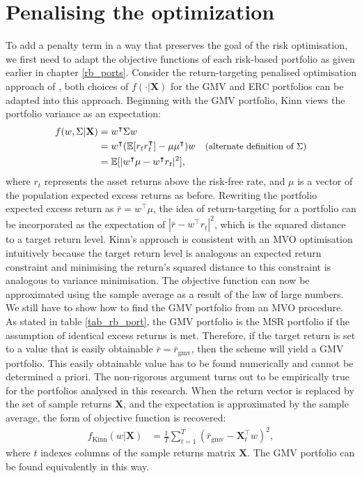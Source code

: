 \documentclass[a4paper,11pt,nocenter,bold,noupper,headcount]{mythesis}
\theoremstyle{plain}
\theoremstyle{definition}
\begin{document}
\section{Penalising the optimization}

To add a penalty term in a way that preserves the goal of the risk optimisation, we first need to adapt the objective functions of each risk-based portfolio as given earlier in chapter \ref{rb_ports}. Consider the return-targeting penalised optimisation approach of \cite{K18}, both choices of $f(\cdot|\textbf{X})$ for the GMV and ERC portfolios can be adapted into this approach. Beginning with the GMV portfolio, Kinn views the portfolio variance as an expectation:
\begin{align*}
f(w, \Sigma  | \textbf{X}) &= w^\intercal \Sigma w &\\
& = w^\intercal (\mathbb{E}[{r}_t {r}_t^\intercal] - \mu \mu^\intercal) w & \small\text{(alternate definition of $\Sigma$)} \\
& = \mathbb{E}[|w^\intercal \mu - w^\intercal {r}_t|^2],
\end{align*}
where ${r}_t$ represents the asset returns above the risk-free rate, and $\mu$ is a vector of the population expected excess returns as before. Rewriting the portfolio expected excess return as $\bar{r} = w^\intercal \mu$, the idea of return-targeting for a portfolio can be incorporated as the expectation of $|\bar{r} - w^\intercal {r}_t|^2$, which is the squared distance to a target return level. Kinn's approach is consistent with an MVO optimisation intuitively because the target return level is analogous an expected return constraint and minimising the return's squared distance to this constraint is analogous to variance minimisation. The objective function can now be approximated using the sample average as a result of the law of large numbers. We still have to show how to find the GMV portfolio from an MVO procedure. As stated in table \ref{tab_rb_port}, the GMV portfolio is the MSR portfolio if the assumption of identical excess returns is met. Therefore, if the target return is set to a value that is easily obtainable $\bar{r} = \bar{r}_\mathrm{gmv}$, then the scheme will yield a GMV portfolio. This easily obtainable value has to be found numerically and cannot be determined a priori. The non-rigorous argument turns out to be empirically true for the portfolios analysed in this research. When the return vector is replaced by the set of sample returns $\textbf{X}$, and the expectation is approximated by the sample average, the \cite{K18} form of objective function is recovered:
\begin{align} \label{kinn_op_1}
f_{\text{Kinn}}(w|\textbf{X}) &= \frac{1}{T} \sum_{t = 1}^T  (\bar{r}_\mathrm{gmv} - \textbf{X}^\intercal_t w)^2,
\end{align}
where $t$ indexes columns of the sample returns matrix $\textbf{X}$. The GMV portfolio can be found equivalently in this way. 
\end{document}
